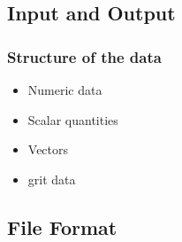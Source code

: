 \documentclass[compress]{beamer}
\begin{document}
\subsection{Input and Output}

\begin{frame}[fragile]
	\frametitle{Structure of the data}

		\begin{itemize}
		    \item Numeric data
			\item Scalar quantities
			\item Vectors
			\item grit data
		\end{itemize}
	
\end{frame}

\subsection{File Format}
\end{document}
